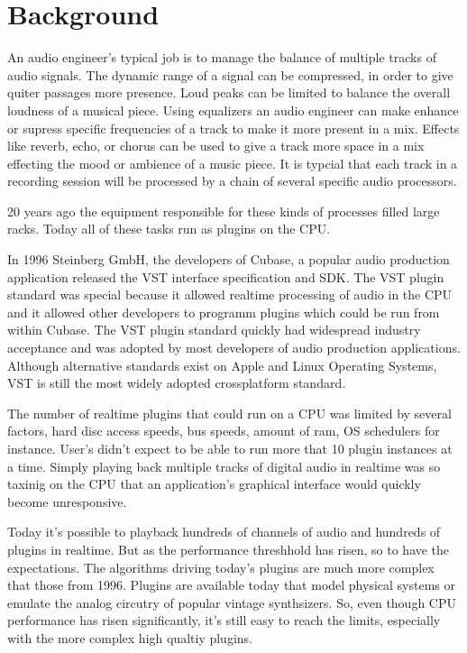 \section{Background}

An audio engineer's typical job is to manage the balance of multiple tracks of audio signals. The dynamic range of a signal can be compressed, in order to give quiter passages more presence. Loud peaks can be limited to balance the overall loudness of a musical piece. Using equalizers an audio engineer can make enhance or supress specific frequencies of a track to make it more present in a mix. Effects like reverb, echo, or chorus can be used to give a track more space in a mix effecting the mood or ambience of a music piece. It is typcial that each track in a recording session will be processed by a chain of several specific audio processors.

20 years ago the equipment responsible for these kinds of processes filled large racks. Today all of these tasks run as plugins on the CPU.

In 1996 Steinberg GmbH, the developers of Cubase, a popular audio production application released the VST interface specification and SDK.\cite{VST-wikipedia} The VST plugin standard was special because it allowed realtime processing of audio in the CPU and it allowed other developers to programm plugins which could be run from within Cubase. The VST plugin standard quickly had widespread industry acceptance and was adopted by most developers of audio production applications. Although alternative standards exist on Apple and Linux Operating Systems, VST is still the most widely adopted crossplatform standard.

The number of realtime plugins that could run on a CPU was limited by several factors, hard disc access speeds, bus speeds, amount of ram, OS schedulers for instance\cite{latency98}. User's didn't expect to be able to run more that 10 plugin instances at a time. Simply playing back multiple tracks of digital audio in realtime was so taxinig on the CPU that an application's graphical interface would quickly become unresponsive.

Today it's possible to playback hundreds of channels of audio and hundreds of plugins in realtime. But as the performance threshhold has risen, so to have the expectations. The algorithms driving today's plugins are much more complex that those from 1996. Plugins are available today that model physical systems or emulate the analog circutry of popular vintage synthsizers. So, even though CPU performance has risen significantly, it's still easy to reach the limits, especially with the more complex high qualtiy plugins.

